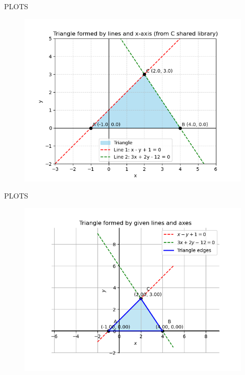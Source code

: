 \documentclass{beamer}
\begin{document}
\begin{frame}[fragile]{PLOTS}
\begin{figure}
    \centering
    \includegraphics[width=0.9\columnwidth]{figs/fig81.png}
    \caption{}
    \label{fig:placeholder}
\end{figure}
\end{frame}
\begin{frame}[fragile]{PLOTS}
\begin{figure}
    \centering
    \includegraphics[width=0.9\columnwidth]{figs/fig82.png}
    \caption{}
    \label{fig:placeholder}
\end{figure}
\end{frame}

 
\end{document}
